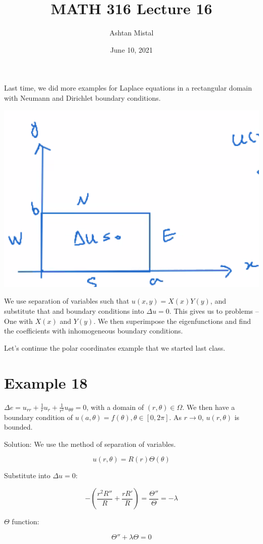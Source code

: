 \documentclass{article}
\title{MATH 316 Lecture 16}
\author{Ashtan Mistal}
\date{June 10, 2021}
\begin{document}
\ifstandalone
\maketitle
\fi

\graphicspath{{./Lecture16/}}


Last time, we did more examples for Laplace equations in a rectangular domain with Neumann and Dirichlet boundary conditions.

\begin{center}
    \includegraphics[width = 0.5 \textwidth]{1.png}
\end{center}

We use separation of variables such that $u(x,y) = X(x) Y(y)$, and substitute that and boundary conditions into $\Delta u = 0$. This gives us to problems -- One with $X(x)$ and $Y(y)$. We then superimpose the eigenfunctions and find the coefficients with inhomogeneous boundary conditions. 

Let's continue the polar coordinates example that we started last class. 

\section{Example 18}

$\Delta e = u_{rr} + \frac{1}{r} u_r + \frac{1}{r^2} u_{\theta \theta} = 0$, with a domain of $(r, \theta) \in \Omega$. We then have a boundary condition of $u(a, \theta) = f(\theta), \theta \in [0, 2 \pi]$. As $r \to 0$, $u(r,\theta) $ is bounded. 

\hfill

Solution: We use the method of separation of variables. 

$$u(r,\theta) = R(r) \Theta (\theta)$$

Substitute into $\Delta u = 0$:

$$- \left( \frac{r^2 R''}{R} + \frac{r R'}{R} \right) = \frac{\Theta''}{\Theta} = - \lambda$$

$\Theta$ function:

$$\Theta'' + \lambda \Theta = 0$$
\end{document}
